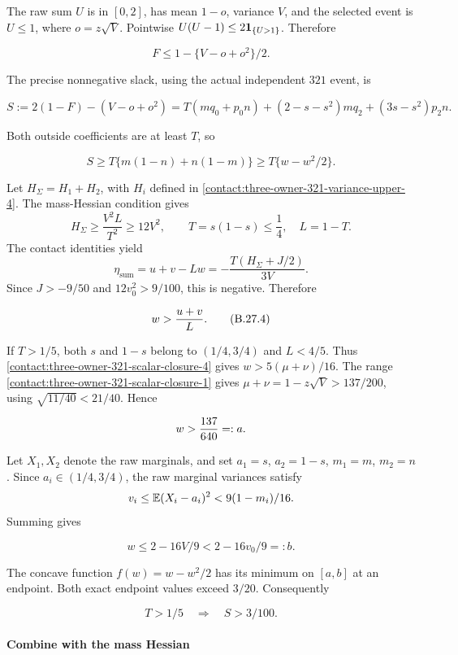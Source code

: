 The raw sum $U$ is in $[0,2]$, has mean $1-o$, variance $V$, and the
selected event is $U\le 1$, where $o=z\sqrt V$. Pointwise
$U(U-1)\le 2\mathbf 1_{\{U>1\}}$. Therefore

\[
 F\le1-\{V-o+o^2\}/2.
\tag{B.27.2}\label{contact:three-owner-321-scalar-closure-2}
\]

The precise nonnegative slack, using the actual independent $321$ event,
is

\[
 S:=2(1-F)-(V-o+o^2)
 =T(mq_0+p_0n)+(2-s-s^2)mq_2+(3s-s^2)p_2n.
\]

Both outside coefficients are at least $T$, so

\[
 S\ge T\{m(1-n)+n(1-m)\}
 \ge T\{w-w^2/2\}.
\tag{B.27.3}\label{contact:three-owner-321-scalar-closure-3}
\]

Let $H_{\Sigma}=H_1+H_2$, with $H_i$ defined in
\eqref{contact:three-owner-321-variance-upper-4}. The mass-Hessian
condition gives
\[
 H_{\Sigma}\ge\frac{V^2L}{T^2}\ge12V^2,
 \qquad T=s(1-s)\le\frac14,\quad L=1-T.
\]
The contact identities yield
\[
 \eta_{\mathrm{sum}}=u+v-Lw
 =-\frac{T(H_{\Sigma}+J/2)}{3V}.
\]
Since $J>-9/50$ and $12v_0^2>9/100$, this is negative. Therefore

\[
 w>{u+v\over L}.
\tag{B.27.4}\label{contact:three-owner-321-scalar-closure-4}
\]

If $T>1/5$, both $s$ and $1-s$ belong to $(1/4,3/4)$ and $L<4/5$.
Thus \eqref{contact:three-owner-321-scalar-closure-4} gives $w>5(\mu+\nu)/16$. The range \eqref{contact:three-owner-321-scalar-closure-1} gives
$\mu+\nu=1-z\sqrt V>137/200$, using $\sqrt{11/40}<21/40$. Hence

\[
 w>{137\over640}=:a.
\]

Let $X_1,X_2$ denote the raw marginals, and set $a_1=s$, $a_2=1-s$,
$m_1=m$, $m_2=n$. Since
$a_i\in(1/4,3/4)$, the raw marginal variances satisfy
\[
 v_i\le\mathbb E(X_i-a_i)^2<9(1-m_i)/16.
\]
Summing gives

\[
 w\le2-16V/9<2-16v_0/9=:b.
\]

The concave function $f(w)=w-w^2/2$ has its minimum on $[a,b]$ at an
endpoint. Both exact endpoint values exceed $3/20$. Consequently

\[
 \boxed{T>1/5\quad\Longrightarrow\quad S>3/100.}
\tag{B.27.5}\label{contact:three-owner-321-scalar-closure-5}
\]

\paragraph{Combine with the mass Hessian}

